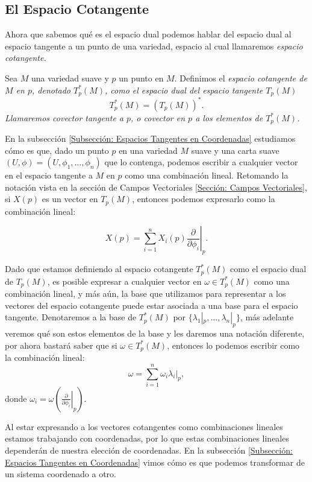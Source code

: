 \subsection{El Espacio Cotangente}\label{Subsección: El Espacio Cotangente}
Ahora que sabemos qué es el espacio dual podemos hablar del espacio dual al espacio tangente a un punto de una variedad, espacio al cual llamaremos \it{espacio cotangente}.

\begin{definition}
	Sea $M$ una variedad suave y $p$ un punto en $M$. Definimos el \it{espacio cotangente de $M$ en $p$}, denotado $T_{p}^{*}(M)$, como el espacio dual del espacio tangente $T_p(M)$
	\[
		T^{*}_p(M) = (T_p(M))^*.
	\]
	Llamaremos \textit{covector tangente a $p$}, o \textit{covector en $p$} a los elementos de $T_p^{*}(M)$.
\end{definition}

En la subsección \ref{Subsección: Espacios Tangentes en Coordenadas} estudiamos cómo es que, dado un punto $p$ en una variedad $M$ suave y una carta suave $(U,\phi) = (U,\phi_1,\ldots,\phi_n)$ que lo contenga, podemos escribir a cualquier vector en el espacio tangente a $M$ en $p$ como una combinación lineal. Retomando la notación vista en la sección de Campos Vectoriales \ref{Sección: Campos Vectoriales}, si $X(p)$ es un vector en $T_p(M)$, entonces podemos expresarlo como la combinación lineal:

\[
	X(p) = \sum_{i=1}^{n} X_i(p) \left. \frac{\partial}{\partial \phi_i} \right|_{p}.
\]

Dado que estamos definiendo al espacio cotangente $T_{p}^{*}(M)$ como el espacio dual de $T_p(M)$, es posible expresar a cualquier vector en $\omega \in T_{p}^{*}(M)$ como una combinación lineal, y más aún, la base que utilizamos para representar a los vectores del espacio cotangente puede estar asociada a una base para el espacio tangente. Denotaremos a la base de $T_{p}^{*}(M)$ por $\{\lambda_1|_p, \ldots, \lambda_n|_p\}$, más adelante veremos qué son estos elementos de la base y les daremos una notación diferente, por ahora bastará saber que si $\omega \in T_{p}^{*}(M)$, entonces lo podemos escribir como la combinación lineal:
\[
	\omega = \sum_{i=1}^{n} \omega_i \left. \lambda_i \right|_p,
\]
donde $\omega_i = \omega \left( \left. \frac{\partial}{\partial \phi_i} \right|_p\right)$.

Al estar expresando a los vectores cotangentes como combinaciones lineales estamos trabajando con coordenadas, por lo que estas combinaciones lineales dependerán de nuestra elección de coordenadas. En la subsección \ref{Subsección: Espacios Tangentes en Coordenadas} vimos cómo es que podemos transformar de un sistema coordenado a otro.

